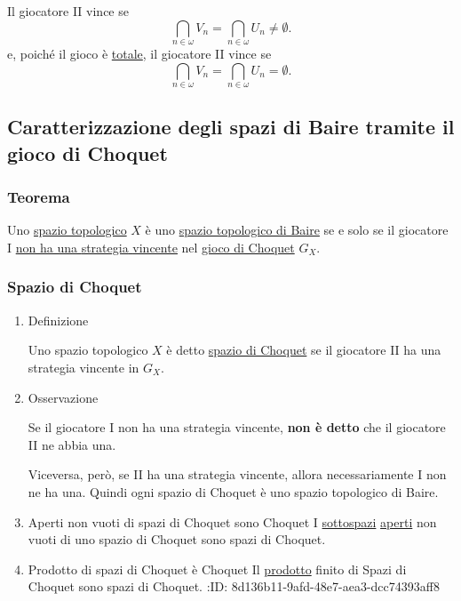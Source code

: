 \documentclass{article}
\newcommand{\1}{\mathds{1}}
\begin{document}
Il giocatore II vince se
\begin{equation*}
\bigcap_{n \in \omega} V_{n} = \bigcap_{n \in \omega} U_{n} \neq \emptyset.
\end{equation*}
e, poiché il gioco è \hyperref[sec:org8c60113]{totale}, il giocatore II vince se
\begin{equation*}
\bigcap_{n \in \omega} V_{n} = \bigcap_{n \in \omega} U_{n} = \emptyset.
\end{equation*}
\subsection{Caratterizzazione degli spazi di Baire tramite il gioco di Choquet}
\label{sec:orga746ed3}
\subsubsection{Teorema}
\label{sec:org3cbe1dc}

Uno \href{../../../../../../../org/roam/20250103145124-topologia.org}{spazio topologico} \(X\) è uno \href{../../../../../../../org/roam/20250514154101-spazio_topologico_di_baire.org}{spazio topologico di Baire} se e solo se il giocatore I \uline{non ha una \hyperref[sec:org1db90c5]{strategia} \hyperref[sec:org1db90c5]{vincente}} nel \hyperref[sec:org9c9de7e]{gioco di Choquet} \(G_{X}\).
\subsubsection{Spazio di Choquet}
\label{sec:org12a4e1c}
\begin{enumerate}
\item Definizione
\label{sec:orga058a3c}

Uno spazio topologico \(X\) è detto \uline{spazio di Choquet} se il giocatore II ha una strategia vincente in \(G_{X}\).
\item Osservazione
\label{sec:org31657a2}

Se il giocatore I non ha una strategia vincente, \textbf{non è detto} che il giocatore II ne abbia una.

Viceversa, però, se II ha una strategia vincente, allora necessariamente I non ne ha una. Quindi ogni spazio di Choquet è uno spazio topologico di Baire.
\item Aperti non vuoti di spazi di Choquet sono Choquet
\label{sec:orge945bdd}
I \href{../../../../../../../org/roam/20250103163814-sottospazio_topologico.org}{sottospazi} \href{../../../../../../../org/roam/20250103145124-topologia.org}{aperti} non vuoti di uno spazio di Choquet sono spazi di Choquet.
\item Prodotto di spazi di Choquet è Choquet
\label{sec:orge4a4a9a}
Il \href{../../../../../../../org/roam/20250109154723-topologia_prodotto.org}{prodotto} finito di Spazi di Choquet sono spazi di Choquet.
:ID:       8d136b11-9afd-48e7-aea3-dcc74393aff8
\end{enumerate}
\end{document}
